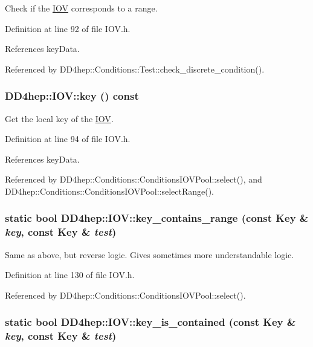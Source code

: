Check if the \hyperlink{class_d_d4hep_1_1_i_o_v}{IOV} corresponds to a range. 

Definition at line 92 of file IOV.h.

References keyData.

Referenced by DD4hep::Conditions::Test::check\_\-discrete\_\-condition().\hypertarget{class_d_d4hep_1_1_i_o_v_adf743118faa708c28f3299867f946567}{
\subsubsection[{key}]{ DD4hep::IOV::key () const}}
\label{class_d_d4hep_1_1_i_o_v_adf743118faa708c28f3299867f946567}


Get the local key of the \hyperlink{class_d_d4hep_1_1_i_o_v}{IOV}. 

Definition at line 94 of file IOV.h.

References keyData.

Referenced by DD4hep::Conditions::ConditionsIOVPool::select(), and DD4hep::Conditions::ConditionsIOVPool::selectRange().\hypertarget{class_d_d4hep_1_1_i_o_v_abb985b984cc6eb8576a4f124de7668f5}{
\subsubsection[{key\_\-contains\_\-range}]{\setlength{\rightskip}{0pt plus 5cm}static bool DD4hep::IOV::key\_\-contains\_\-range (const {\bf Key} \& {\em key}, \/  const {\bf Key} \& {\em test})}}
\label{class_d_d4hep_1_1_i_o_v_abb985b984cc6eb8576a4f124de7668f5}


Same as above, but reverse logic. Gives sometimes more understandable logic. 

Definition at line 130 of file IOV.h.

Referenced by DD4hep::Conditions::ConditionsIOVPool::select().\hypertarget{class_d_d4hep_1_1_i_o_v_a43849b67b7823c3acd522bac26cf179d}{
\subsubsection[{key\_\-is\_\-contained}]{\setlength{\rightskip}{0pt plus 5cm}static bool DD4hep::IOV::key\_\-is\_\-contained (const {\bf Key} \& {\em key}, \/  const {\bf Key} \& {\em test})}}
\label{class_d_d4hep_1_1_i_o_v_a43849b67b7823c3acd522bac26cf179d}


